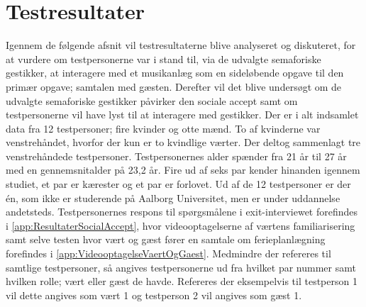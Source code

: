\chapter{Testresultater}
\label{TestresultaterSocialAccept}
%
Igennem de følgende afsnit vil testresultaterne blive analyseret og diskuteret, for at vurdere om testpersonerne var i stand til, via de udvalgte semaforiske gestikker, at interagere med et musikanlæg som en sideløbende opgave til den primær opgave; samtalen med gæsten. Derefter vil det blive undersøgt om de udvalgte semaforiske gestikker påvirker den sociale accept samt om testpersonerne vil have lyst til at interagere med gestikker.\blankline
%
Der er i alt indsamlet data fra 12 testpersoner; fire kvinder og otte mænd. To af kvinderne var venstrehåndet, hvorfor der kun er to kvindlige værter. Der deltog sammenlagt tre venstrehåndede testpersoner. Testpersonernes alder spænder fra 21 år til 27 år med en gennemsnitalder på 23,2 år. Fire ud af seks par kender hinanden igennem studiet, et par er kærester og et par er forlovet. Ud af de 12 testpersoner er der én, som ikke er studerende på Aalborg Universitet, men er under uddannelse andetsteds. Testpersonernes respons til spørgsmålene i exit-interviewet forefindes i \autoref{app:ResultaterSocialAccept}, hvor videooptagelserne af værtens familiarisering samt selve testen hvor vært og gæst fører en samtale om ferieplanlægning forefindes i \autoref{app:VideooptagelseVaertOgGaest}. Medmindre der refereres til samtlige testpersoner, så angives testpersonerne ud fra hvilket par nummer samt hvilken rolle; vært eller gæst de havde. Refereres der eksempelvis til testperson 1 vil dette angives som vært 1 og testperson 2 vil angives som gæst 1. 





